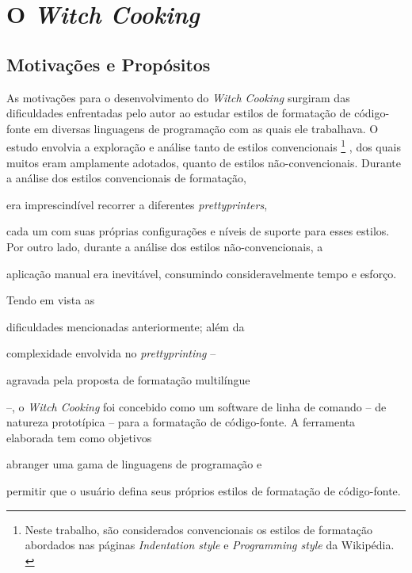 \documentclass
  [11pt,a4paper,english,brazil,openright,sumario=tradicional,twoside]
  {abntex2}
\newcommand{\witchcooking}{\textit{Witch Cooking}\xspace}
\begin{document}

  \chapter{O \witchcooking}

  \section{Motivações e Propósitos}

  As motivações para o desenvolvimento do \witchcooking surgiram das
  dificuldades enfrentadas pelo autor ao estudar estilos de formatação de
  código-fonte em diversas linguagens de programação com as quais ele
  trabalhava. O estudo envolvia a exploração e análise tanto de estilos
  convencionais%
  \footnote
    { Neste trabalho, são considerados convencionais os estilos de formatação
      abordados nas páginas \textit{Indentation style} e
      \textit{Programming style} da Wikipédia.
      \cites{wiki-2023-indentation}{wiki-2023-programming}}%
  , dos quais muitos eram amplamente adotados, quanto de estilos
  não-convencionais. Durante a análise dos estilos convencionais de formatação,
  \begin{inparaenum}
    \item era imprescindível recorrer a diferentes \textit{prettyprinters},
    \item cada um com suas próprias configurações e níveis de suporte para
          esses estilos. Por outro lado, durante a análise dos estilos
          não-convencionais, a
    \item aplicação manual era inevitável, consumindo consideravelmente tempo e
          esforço.
  \end{inparaenum}

  Tendo em vista as
  \begin{inparaenum}
    \item dificuldades mencionadas anteriormente; além da
    \item complexidade envolvida no \textit{prettyprinting} --
    \item agravada pela proposta de formatação multilíngue
  \end{inparaenum}
  --, o \witchcooking foi concebido como um software de linha de comando --
  de natureza prototípica -- para a formatação de código-fonte. A ferramenta
  elaborada tem como objetivos
  \begin{inparaenum}
    \item abranger uma gama de linguagens de programação e
    \item permitir que o usuário defina seus próprios estilos de formatação
          de código-fonte.
  \end{inparaenum}
\end{document}
